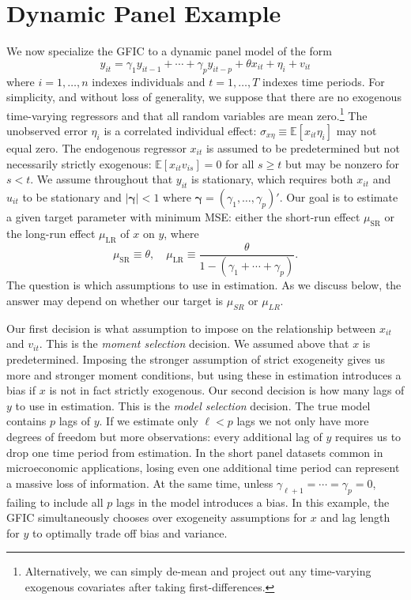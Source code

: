 \section{Dynamic Panel Example}
\label{sec:panel}
We now specialize the GFIC to a dynamic panel model of the form 
\begin{equation}
  y_{it} = \gamma_1 y_{it-1} + \cdots + \gamma_p y_{it-p} + \theta x_{it} + \eta_i + v_{it}
  \label{eq:truepanel}
\end{equation}
where $i = 1, \hdots, n$ indexes individuals and $t=1, \hdots, T$  indexes time periods. 
For simplicity, and without loss of generality, we suppose that there are no exogenous time-varying regressors and that all random variables are mean zero.\footnote{Alternatively, we can simply de-mean and project out any time-varying exogenous covariates after taking first-differences.} 
The unobserved error $\eta_i$ is a correlated individual effect: $\sigma_{x\eta}\equiv \mathbb{E}\left[ x_{it}\eta_i \right]$ may not equal zero. 
The endogenous regressor $x_{it}$ is assumed to be predetermined but not necessarily strictly exogenous: $\mathbb{E}[x_{it} v_{is}]=0$ for all $s \geq t$ but may be nonzero for $s < t$.  
We assume throughout that $y_{it}$ is stationary, which requires both $x_{it}$ and $u_{it}$ to be stationary and $|\boldsymbol{\gamma}| < 1$ where $\boldsymbol{\gamma} = (\gamma_1, \dots, \gamma_p)'$.
Our goal is to estimate a given target parameter with minimum MSE: either the short-run effect $\mu_{\text{SR}}$ or the long-run effect $\mu_{\text{LR}}$ of $x$ on $y$, where 
\begin{equation}
  \mu_{\text{SR}} \equiv \theta, \quad \mu_{\text{LR}} \equiv \frac{\theta}{1- (\gamma_1 + \cdots + \gamma_p)}.
  \label{eq:paneltarget}
\end{equation}
The question is which assumptions to use in estimation.
As we discuss below, the answer may depend on whether our target is $\mu_{SR}$ or $\mu_{LR}$.

Our first decision is what assumption to impose on the relationship between $x_{it}$ and $v_{it}$.
This is the \emph{moment selection} decision.
We assumed above that $x$ is predetermined.
Imposing the stronger assumption of strict exogeneity gives us more and stronger moment conditions, but using these in estimation introduces a bias if $x$ is not in fact strictly exogenous.
Our second decision is how many lags of $y$ to use in estimation.
This is the \emph{model selection} decision.
The true model contains $p$ lags of $y$.
If we estimate only $\ell < p$ lags we not only have more degrees of freedom but more observations: every additional lag of $y$ requires us to drop one time period from estimation. 
In the short panel datasets common in microeconomic applications, losing even one additional time period can represent a massive loss of information.
At the same time, unless $\gamma_{\ell+1} = \cdots = \gamma_p = 0$, failing to include all $p$ lags in the model introduces a bias.
In this example, the GFIC simultaneously chooses over exogeneity assumptions for $x$ and lag length for $y$ to optimally trade off bias and variance.

